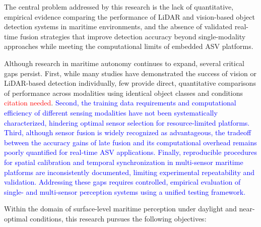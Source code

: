 \documentclass[../main.tex]{subfiles}
\begin{document}
The central problem addressed by this research is the lack of quantitative, empirical evidence comparing the performance of \ac{LiDAR} and vision-based object detection systems in maritime environments, and the absence of validated real-time fusion strategies that improve detection accuracy beyond single-modality approaches while meeting the computational limits of embedded \ac{ASV} platforms.

Although research in maritime autonomy continues to expand, several critical gaps persist.  
First, while many studies have demonstrated the success of vision or \ac{LiDAR}-based detection individually, few provide direct, quantitative comparisons of performance across modalities using identical object classes and conditions \textcolor{red}{citation needed}.  
\textcolor{blue}{Second, the training data requirements and computational efficiency of different sensing modalities have not been systematically characterized, hindering optimal sensor selection for resource-limited platforms. 
Third, although sensor fusion is widely recognized as advantageous, the tradeoff between the accuracy gains of late fusion and its computational overhead remains poorly quantified for real-time \ac{ASV} applications.  
Finally, reproducible procedures for spatial calibration and temporal synchronization in multi-sensor maritime platforms are inconsistently documented, limiting experimental repeatability and validation.  
Addressing these gaps requires controlled, empirical evaluation of single- and multi-sensor perception systems using a unified testing framework.}

Within the domain of surface-level maritime perception under daylight and near-optimal conditions, this research pursues the following objectives:
\end{document}
